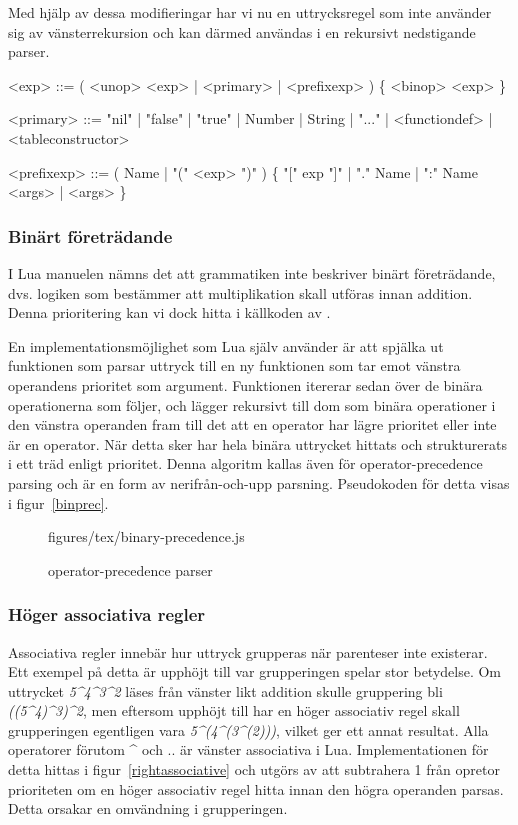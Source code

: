 Med hjälp av dessa modifieringar har vi nu en uttrycksregel som inte använder
sig av vänsterrekursion och kan därmed användas i en rekursivt nedstigande
parser.

\setlength{\grammarindent}{6em}
\begin{grammar}
  \singlespace\small%
  \selectfont
  <exp> ::= ( <unop> <exp> | <primary> | <prefixexp> ) \{ <binop> <exp> \}

  <primary> ::= "nil" | "false" | "true" | Number | String | "..." |
      <functiondef> | <tableconstructor>

  <prefixexp> ::= ( Name | "(" <exp> ")" ) \{ "[" exp "]" | "." Name |
      ":" Name <args> | <args> \}
\end{grammar}

\subsubsection{Binärt företrädande}

I Lua manuelen \citep{luaref} nämns det att grammatiken inte beskriver binärt företrädande,
dvs. logiken som bestämmer att multiplikation skall utföras innan addition.
Denna prioritering kan vi dock hitta i källkoden av \cite{lparse}.

En implementationsmöjlighet som Lua själv använder är att spjälka ut
funktionen som parsar uttryck till en ny funktionen som tar emot vänstra
operandens prioritet som argument. Funktionen itererar sedan över de binära
operationerna som följer, och lägger rekursivt till dom som binära operationer
i den vänstra operanden fram till det att en operator har lägre prioritet
eller inte är en operator. När detta sker har hela binära uttrycket hittats
och strukturerats i ett träd enligt prioritet. Denna algoritm kallas även för
operator-precedence parsing och är en form av nerifrån-och-upp parsning.
Pseudokoden för detta visas i figur~\ref{binprec}.

\begin{figure}[ht]
    {figures/tex/binary-precedence.js}
  \caption{operator-precedence parser}
  \label{fig:binprec}
\end{figure}


\subsubsection{Höger associativa regler}

Associativa regler innebär hur uttryck grupperas när parenteser inte
existerar. Ett exempel på detta är upphöjt till var grupperingen spelar stor
betydelse. Om uttrycket \textit{5\^{}4\^{}3\^{}2} läses från vänster likt
addition skulle gruppering bli \textit{((5\^{}4)\^{}3)\^{}2}, men eftersom
upphöjt till har en höger associativ regel skall grupperingen egentligen vara
\textit{5\^{}(4\^{}(3\^{}(2)))}, vilket ger ett annat resultat. Alla
operatorer förutom \^{} och .. är vänster associativa i Lua. Implementationen
för detta hittas i figur~\ref{rightassociative} och utgörs av att subtrahera
1 från opretor prioriteten om en höger associativ regel hitta innan den
högra operanden parsas. Detta orsakar en omvändning i grupperingen.

